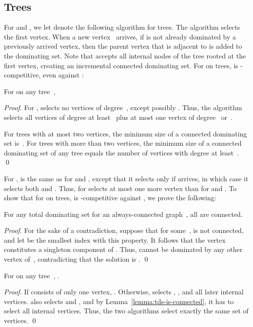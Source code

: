 \subsection{Trees}

For \ds and \cds, we let \aparent denote the following algorithm for trees.  The
algorithm selects the first vertex.  When a new vertex~ arrives,
if  is not already dominated by a previously arrived vertex,
then the parent vertex that  is adjacent to is added to the
dominating set.
Note that \aparent accepts all internal nodes of the tree rooted
at the first vertex, creating an incremental connected dominating set.
For \cds on trees, \aparent is -competitive,
even against \offopt:

\begin{lemma}
\label{lemma:cds-trees-alg}
For \cds on any tree~, 

\end{lemma}
\begin{proof}
For \cds, \aparent selects no vertices of degree~, except possibly .
Thus, the algorithm selects all vertices of degree at least~ plus at most one
vertex of degree~ or~.

For trees with at most two vertices, the minimum size of a connected dominating
set is~.
For trees with more than two vertices, the minimum size of a
connected dominating set of any tree  equals the number of vertices
with degree at least~.
\qed\end{proof}

For \tds, \aparent is the same as for \ds and \cds, except that it 
 selects  only if  arrives, in which case it selects both  and .
Thus, \aparent for \tds selects at most one more vertex than \aparent
for \ds and \cds.
To show that for \tds on trees,
\aparent is -competitive against \onopt,
we prove the following:

\begin{lemma}
\label{lemma:tds-is-connected}
For any \incr total dominating set  for an always\--con\-nect\-ed graph~,
all  are connected.
\end{lemma}
\begin{proof}
For the sake of a contradiction, suppose that for some~, 
 is not connected, and let
 be the smallest index with this property. It follows that the vertex
 constitutes a singleton component of 
. Thus,  cannot be dominated by any other vertex of~,
contradicting that the solution is \incr.
\qed\end{proof}

\begin{lemma}
\label{lemma:tds-trees-alg}
For \tds on any tree~, .
\end{lemma}
\begin{proof}
If  consists of only one vertex, .
Otherwise, \aparent selects , , and all later internal
vertices.
\onopt also selects  and , and by
Lemma~\ref{lemma:tds-is-connected}, it has to select all internal
vertices.
Thus, the two algorithms select exactly the same set of vertices.
\qed\end{proof}

